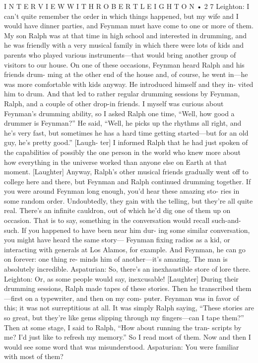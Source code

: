 \documentclass[10pt,oneside]{article}
\begin{document}
I N T E R V I E W  W I T H  R O B E R T  L E I G H T O N • 2 7 Leighton: I can’t quite remember the order in which things happened, but my wife and I would have dinner parties, and Feynman must have come to one or more of them. My son Ralph was at that time in high school and interested in drumming, and he was friendly with a very musical family in which there were lots of kids and parents who played various instruments---that would bring another group of visitors to our house. On one of these occasions, Feynman heard Ralph and his friends drum- ming at the other end of the house and, of course, he went in---he was more comfortable with kids anyway. He introduced himself and they in- vited him to drum. And that led to rather regular drumming sessions by Feynman, Ralph, and a couple of other drop-in friends. I myself was curious about Feynman’s drumming ability, so I asked Ralph one time, “Well, how good a drummer is Feynman?” He said, “Well, he picks up the rhythms all right, and he’s very fast, but sometimes he has a hard time getting started---but for an old guy, he’s pretty good.” [Laugh- ter] I informed Ralph that he had just spoken of the capabilities of possibly the one person in the world who knew more about how everything in the universe worked than anyone else on Earth at that moment. [Laughter] Anyway, Ralph’s other musical friends gradually went off to college here and there, but Feynman and Ralph continued drumming together. If you were around Feynman long enough, you’d hear these amazing sto- ries in some random order. Undoubtedly, they gain with the telling, but they’re all quite real. There’s an infinite cauldron, out of which he’d dig one of them up on occasion. That is to say, something in the conversation would recall such-and-such. If you happened to have been near him dur- ing some similar conversation, you might have heard the same story--- Feynman fixing radios as a kid, or interacting with generals at Los Alamos, for example. And Feynman, he can go on forever: one thing re- minds him of another---it’s amazing. The man is absolutely incredible. Aspaturian: So, there’s an inexhaustible store of lore there. Leighton: Or, as some people would say, inexcusable! [Laughter] During their drumming sessions, Ralph made tapes of these stories. Then he transcribed them---first on a typewriter, and then on my com- puter. Feynman was in favor of this; it was not surreptitious at all. It was simply Ralph saying, “These stories are so great, but they’re like gems slipping through my fingers---can I tape them?” Then at some stage, I said to Ralph, “How about running the tran- scripts by me? I’d just like to refresh my memory.” So I read most of them. Now and then I would see some word that was misunderstood. Aspaturian: You were familiar with most of them?\par
\end{document}

